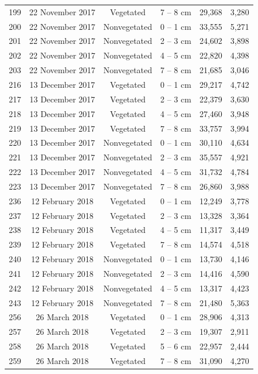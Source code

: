 \documentclass[12pt,]{article}
\begin{document}
\begin{longtable}[t]{cccccc}
199 & 22 November 2017 & Vegetated & 7 – 8 cm & 29,368 & 3,280\\
200 & 22 November 2017 & Nonvegetated & 0 – 1 cm & 33,555 & 5,271\\
201 & 22 November 2017 & Nonvegetated & 2 – 3 cm & 24,602 & 3,898\\
202 & 22 November 2017 & Nonvegetated & 4 – 5 cm & 22,820 & 4,398\\
203 & 22 November 2017 & Nonvegetated & 7 – 8 cm & 21,685 & 3,046\\
216 & 13 December 2017 & Vegetated & 0 – 1 cm & 29,217 & 4,742\\
217 & 13 December 2017 & Vegetated & 2 – 3 cm & 22,379 & 3,630\\
218 & 13 December 2017 & Vegetated & 4 – 5 cm & 27,460 & 3,948\\
219 & 13 December 2017 & Vegetated & 7 – 8 cm & 33,757 & 3,994\\
220 & 13 December 2017 & Nonvegetated & 0 – 1 cm & 30,110 & 4,634\\
221 & 13 December 2017 & Nonvegetated & 2 – 3 cm & 35,557 & 4,921\\
222 & 13 December 2017 & Nonvegetated & 4 – 5 cm & 31,732 & 4,784\\
223 & 13 December 2017 & Nonvegetated & 7 – 8 cm & 26,860 & 3,988\\
236 & 12 February 2018 & Vegetated & 0 – 1 cm & 12,249 & 3,778\\
237 & 12 February 2018 & Vegetated & 2 – 3 cm & 13,328 & 3,364\\
238 & 12 February 2018 & Vegetated & 4 – 5 cm & 11,317 & 3,449\\
239 & 12 February 2018 & Vegetated & 7 – 8 cm & 14,574 & 4,518\\
240 & 12 February 2018 & Nonvegetated & 0 – 1 cm & 13,730 & 4,146\\
241 & 12 February 2018 & Nonvegetated & 2 – 3 cm & 14,416 & 4,590\\
242 & 12 February 2018 & Nonvegetated & 4 – 5 cm & 13,317 & 4,423\\
243 & 12 February 2018 & Nonvegetated & 7 – 8 cm & 21,480 & 5,363\\
256 & 26 March 2018 & Vegetated & 0 – 1 cm & 28,906 & 4,313\\
257 & 26 March 2018 & Vegetated & 2 – 3 cm & 19,307 & 2,911\\
258 & 26 March 2018 & Vegetated & 5 – 6 cm & 22,957 & 2,444\\
259 & 26 March 2018 & Vegetated & 7 – 8 cm & 31,090 & 4,270\\

\end{longtable}
\end{document}
